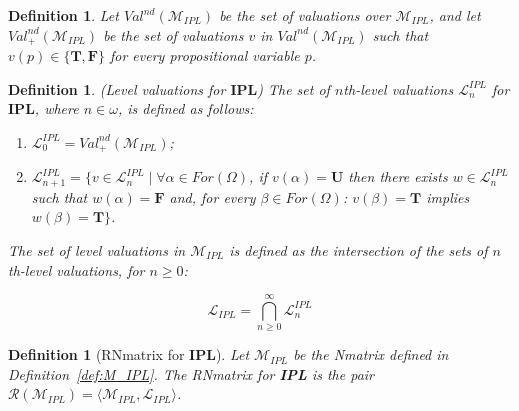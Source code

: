 \documentclass[12pt]{article}
\newtheorem{definition}[theorem]{Definition}
\newcommand{\bT}{\mathbf{T}}
\newcommand{\bU}{\mathbf{U}}
\newcommand{\bF}{\mathbf{F}}
\newcommand{\ipl}{\ensuremath{\mathbf{IPL}}}
\begin{document}


\begin{definition}\label{def:0-level_valuations_IPL}
Let  $Val^{nd}(\mathcal{M}_{IPL})$ be the set of  valuations over $\mathcal{M}_{IPL}$, and let $Val^{nd}_+(\mathcal{M}_{IPL})$ be the set of valuations $v$ in $Val^{nd}(\mathcal{M}_{IPL})$ such that $v(p) \in\{\bT,\bF\}$ for every propositional variable $p$.
\end{definition}


\begin{definition}\label{def:level_valuations_IPL} (Level valuations for \ipl)
The set of $n$th-level valuations $\mathcal{L}^{IPL}_n$ for \ipl, where $n \in \omega$, is defined as follows: 

    \begin{enumerate}[label=\roman*)]
        \item $\mathcal{L}_0^{IPL} = Val^{nd}_+(\mathcal{M}_{IPL})$;
        \item $\mathcal{L}^{IPL}_{n + 1} = \{ v \in \mathcal{L}^{IPL}_n \mid \forall \alpha \in For(\Omega)$, if $v(\alpha)=\bU$ then there exists $w \in \mathcal{L}^{IPL}_n$ such that $w(\alpha)=\bF$ and,  for every $\beta \in  For(\Omega)$: $v(\beta)=\bT$ implies $w(\beta)=\bT\}$.
    \end{enumerate}
    The set of level valuations in $\mathcal{M}_{IPL}$ is defined as the intersection of the sets of $n$th-level valuations, for $n\geq0$:

    \[
        \mathcal{L}_{IPL} = \bigcap^\infty_{n \geq 0} \mathcal{L}^{IPL}_n
    \]

\end{definition}

\begin{definition}[RNmatrix for \textbf{IPL}]\label{def:Rnmatrix_IPL}
    Let $\mathcal{M}_{IPL}$ be the Nmatrix defined in Definition~\ref{def:M_IPL}. The RNmatrix for \textbf{IPL} is the pair $\mathcal{R}(\mathcal{M}_{IPL}) = \langle \mathcal{M}_{IPL}, \mathcal{L}_{IPL}\rangle$.
\end{definition}
\end{document}
